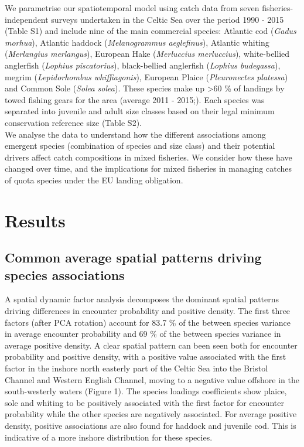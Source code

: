 \documentclass[fleqn,10pt]{wlscirep}
\begin{document}
\begin{linenumbers}
We parametrise our spatiotemporal model using catch data from seven
fisheries-independent surveys undertaken in the Celtic Sea over the period 1990
- 2015 (Table S1) and include nine of the main commercial species: Atlantic cod
(\textit{Gadus morhua}), Atlantic haddock (\textit{Melanogrammus aeglefinus}),
Atlantic whiting (\textit{Merlangius merlangus}), European Hake
(\textit{Merluccius merluccius}), white-bellied anglerfish (\textit{Lophius
	piscatorius}), black-bellied anglerfish (\textit{Lophius budegassa}),
megrim (\textit{Lepidorhombus whiffiagonis}), European Plaice
(\textit{Pleuronectes platessa}) and Common Sole (\textit{Solea solea}). These
species make up \textgreater 60 \% of landings by towed fishing gears for the
area (average 2011 - 2015;\cite{STECF2017}). Each species was separated into
juvenile and adult size classes based on their legal minimum conservation
reference size (Table S2).\\

We analyse the data to understand how the different associations among emergent
species (combination of species and size class) and their potential
drivers affect catch compositions in mixed fisheries. We consider how these
have changed over time, and the implications for mixed fisheries in managing
catches of quota species under the EU landing obligation.\\


\section*{Results\\}

\subsection*{Common average spatial patterns driving species associations\\} A
spatial dynamic factor analysis decomposes the dominant spatial patterns
driving differences in encounter probability and positive density. The first
three factors (after PCA rotation) account for 83.7 \% of the between
species variance in average encounter probability and 69 \% of the
between species variance in average positive density. A clear spatial
pattern can been seen both for encounter probability and positive density, with
a positive value associated with the first factor in the inshore north easterly
part of the Celtic Sea into the Bristol Channel and Western English Channel,
moving to a negative value offshore in the south-westerly waters (Figure 1).
The species loadings coefficients show plaice, sole and whiting to be
positively associated with the first factor for encounter probability while the
other species are negatively associated. For average positive density,
positive associations are also found for haddock and juvenile cod. This is
indicative of a more inshore distribution for these species.\\ 


\end{linenumbers}
\end{document}
